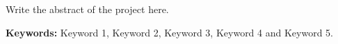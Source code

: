 Write the abstract of the project here. 






\vspace{8pt}
\textbf{Keywords:} Keyword 1, Keyword 2, Keyword 3, Keyword 4 and Keyword 5. 
